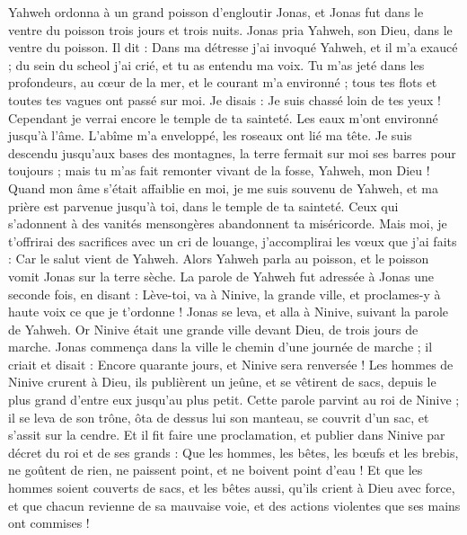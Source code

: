 \begin{multicols}{2}
Yahweh ordonna à un grand poisson d’engloutir Jonas, et Jonas fut dans le ventre du poisson trois jours et trois nuits.
\VerseOne{}Jonas pria Yahweh, son Dieu, dans le ventre du poisson.
Il dit : Dans ma détresse j’ai invoqué Yahweh, et il m'a exaucé ; du sein du scheol j’ai crié, et tu as entendu ma voix.
Tu m'as jeté dans les profondeurs, au cœur de la mer, et le courant m'a environné ; tous tes flots et toutes tes vagues ont passé sur moi.
Je disais : Je suis chassé loin de tes yeux ! Cependant je verrai encore le temple de ta sainteté.
Les eaux m'ont environné jusqu'à l'âme. L'abîme m'a enveloppé, les roseaux ont lié ma tête.
Je suis descendu jusqu'aux bases des montagnes, la terre fermait sur moi ses barres pour toujours ; mais tu m’as fait remonter vivant de la fosse, Yahweh, mon Dieu !
Quand mon âme s’était affaiblie en moi, je me suis souvenu de Yahweh, et ma prière est parvenue jusqu’à toi, dans le temple de ta sainteté.
Ceux qui s’adonnent à des vanités mensongères abandonnent ta miséricorde.
Mais moi, je t’offrirai des sacrifices avec un cri de louange, j’accomplirai les vœux que j’ai faits : Car le salut vient de Yahweh.
Alors Yahweh parla au poisson, et le poisson vomit Jonas sur la terre sèche.
\VerseOne{}La parole de Yahweh fut adressée à Jonas une seconde fois, en disant :
Lève-toi, va à Ninive, la grande ville, et proclames-y à haute voix ce que je t'ordonne !
Jonas se leva, et alla à Ninive, suivant la parole de Yahweh. Or Ninive était une grande ville devant Dieu, de trois jours de marche.
Jonas commença dans la ville le chemin d'une journée de marche ; il criait et disait : Encore quarante jours, et Ninive sera renversée !
Les hommes de Ninive crurent à Dieu, ils publièrent un jeûne, et se vêtirent de sacs, depuis le plus grand d'entre eux jusqu'au plus petit.
Cette parole parvint au roi de Ninive ; il se leva de son trône, ôta de dessus lui son manteau, se couvrit d'un sac, et s'assit sur la cendre.
Et il fit faire une proclamation, et publier dans Ninive par décret du roi et de ses grands : Que les hommes, les bêtes, les bœufs et les brebis, ne goûtent de rien, ne paissent point, et ne boivent point d'eau !
 Et que les hommes soient couverts de sacs, et les bêtes aussi, qu'ils crient à Dieu avec force, et que chacun revienne de sa mauvaise voie, et des actions violentes que ses mains ont commises !

\end{multicols}
